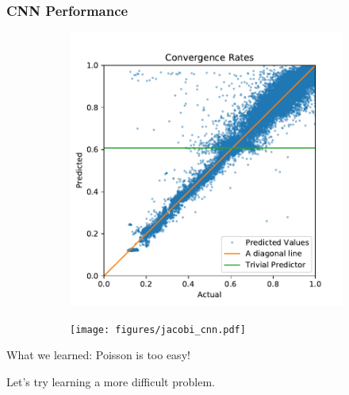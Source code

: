 \documentclass[handout]{beamer}
\begin{document}
\begin{frame}
  \frametitle{CNN Performance}
  \begin{figure}[h]
  \centering
  \begin{subfigure}{.48\textwidth}
    \includegraphics[width=\textwidth]{figures/conv_cnn.pdf}
  \end{subfigure}
  \begin{subfigure}{.48\textwidth}
    \texttt{[image: figures/jacobi\_cnn.pdf]}
  \end{subfigure}
  \label{fig:poisson_conv_pred}
\end{figure}
\end{frame}


\begin{frame}
  What we learned: \pause Poisson is too easy!
  \newline\newline
  \pause

  Let's try learning a more difficult problem.
\end{frame}
\end{document}
